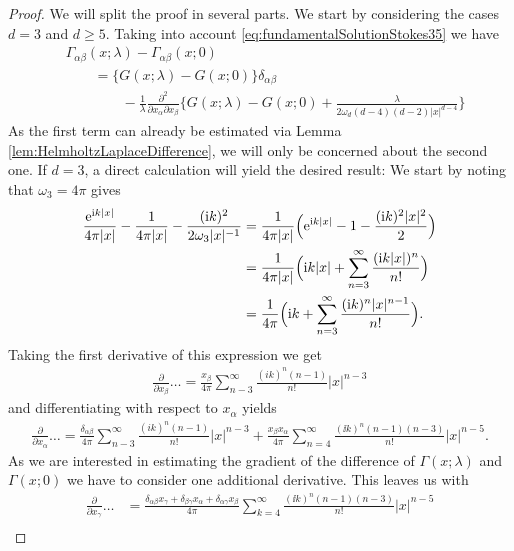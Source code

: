 \begin{proof}
  We will split the proof in several parts.
  We start by considering the cases $d = 3$ and $d \geq 5$.
      Taking into account \eqref{eq:fundamentalSolutionStokes35} we have
      \begin{align*}
        &\Gamma_{\alpha\beta}(x; \lambda) - \Gamma_{\alpha\beta}(x; 0) \\
        &\qquad= \{ G(x; \lambda) - G(x; 0) \}\delta_{\alpha\beta}  \\
        &\qquad\qquad- \frac{1}{\lambda} \frac{\partial^2}{\partial x_\alpha \partial x_\beta} \Big\{ G(x; \lambda) - G(x; 0) + \frac{\lambda}{2 \omega_d (d - 4) (d - 2) |x|^{d - 4}} \Big\}
      \end{align*}
  As the first term can already be estimated via Lemma \ref{lem:HelmholtzLaplaceDifference}, we will only be concerned about the second one.
  If $d = 3$, a direct calculation will yield the desired result:
  We start by noting that $\omega_3 = 4 \pi$ gives
  \begin{align*}
    \frac{\mathrm{e}^{\mathrm{i} k |x|}}{4\pi |x|} - \frac{1}{4 \pi |x|} - \frac{(\mathrm{i} k)^2}{2 \omega_3 |x|^{-1}}
    &= \frac{1}{4 \pi |x|} \Big( \mathrm{e}^{\mathrm{i} k |x|} - 1 - \frac{ (\mathrm{i} k)^2 |x|^2}{2} \Big)\\
    &= \frac{1}{4 \pi |x|} \Big( \mathrm{i} k |x| + \sum_{n = 3}^\infty \frac{(\mathrm{i} k |x| )^n}{n!} \Big) \\
    &= \frac{1}{4\pi} \Big( \mathrm{i} k + \sum_{n = 3}^\infty \frac{ (\mathrm{i} k )^n |x|^{n - 1}}{n!} \Big).
  \end{align*}
  Taking the first derivative of this expression we get
  \begin{align*}
    \frac{\partial}{\partial x_\beta} \dots = 
    \frac{x_\beta}{4 \pi} \sum_{n - 3}^\infty \frac{(ik)^n (n - 1) }{n!} |x|^{n - 3}
  \end{align*}
  and differentiating with respect to $x_\alpha$ yields
  \begin{align*}
    \frac{\partial}{\partial x_\alpha} \dots 
    = \frac{\delta_{\alpha\beta}}{4 \pi} \sum_{n - 3}^\infty \frac{(ik)^n (n - 1) }{n!} |x|^{n - 3}
    + \frac{x_\beta x_\alpha}{4\pi} \sum_{n = 4}^\infty \frac{(\ii k)^n (n - 1) (n - 3)}{n!} |x|^{n - 5}.
  \end{align*}
  As we are interested in estimating the gradient of the difference of $\Gamma(x; \lambda)$ and $\Gamma(x; 0)$ we have to consider one additional derivative. This leaves us with
\begin{align*}
    \frac{\partial}{\partial x_\gamma} \dots
    &= \frac{\delta_{\alpha\beta} x_\gamma + \delta_{\beta\gamma} x_\alpha + \delta_{\alpha\gamma} x_\beta}{4\pi} \sum_{k = 4}^\infty \frac{(\ii k)^n (n - 1) (n - 3)}{n!}  |x|^{n - 5} \\

\end{align*}
\end{proof}
